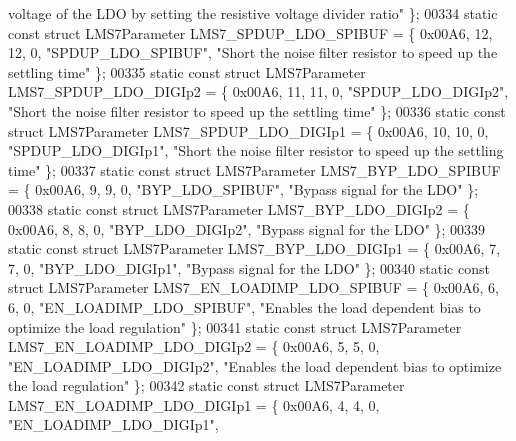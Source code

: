 \begin{DoxyCode}
{       voltage of the LDO by setting the resistive voltage divider ratio"} \};
00334 \textcolor{keyword}{static} \textcolor{keyword}{const} \textcolor{keyword}{struct }LMS7Parameter LMS7_SPDUP_LDO_SPIBUF = \{ 0x00A6, 12, 12, 0, \textcolor{stringliteral}{"SPDUP\_LDO\_SPIBUF"}, \textcolor{stringliteral}{"Short
       the noise filter resistor to speed up the settling time"} \};
00335 \textcolor{keyword}{static} \textcolor{keyword}{const} \textcolor{keyword}{struct }LMS7Parameter LMS7_SPDUP_LDO_DIGIp2 = \{ 0x00A6, 11, 11, 0, \textcolor{stringliteral}{"SPDUP\_LDO\_DIGIp2"}, \textcolor{stringliteral}{"Short
       the noise filter resistor to speed up the settling time"} \};
00336 \textcolor{keyword}{static} \textcolor{keyword}{const} \textcolor{keyword}{struct }LMS7Parameter LMS7_SPDUP_LDO_DIGIp1 = \{ 0x00A6, 10, 10, 0, \textcolor{stringliteral}{"SPDUP\_LDO\_DIGIp1"}, \textcolor{stringliteral}{"Short
       the noise filter resistor to speed up the settling time"} \};
00337 \textcolor{keyword}{static} \textcolor{keyword}{const} \textcolor{keyword}{struct }LMS7Parameter LMS7_BYP_LDO_SPIBUF = \{ 0x00A6, 9, 9, 0, \textcolor{stringliteral}{"BYP\_LDO\_SPIBUF"}, \textcolor{stringliteral}{"Bypass signal
       for the LDO"} \};
00338 \textcolor{keyword}{static} \textcolor{keyword}{const} \textcolor{keyword}{struct }LMS7Parameter LMS7_BYP_LDO_DIGIp2 = \{ 0x00A6, 8, 8, 0, \textcolor{stringliteral}{"BYP\_LDO\_DIGIp2"}, \textcolor{stringliteral}{"Bypass signal
       for the LDO"} \};
00339 \textcolor{keyword}{static} \textcolor{keyword}{const} \textcolor{keyword}{struct }LMS7Parameter LMS7_BYP_LDO_DIGIp1 = \{ 0x00A6, 7, 7, 0, \textcolor{stringliteral}{"BYP\_LDO\_DIGIp1"}, \textcolor{stringliteral}{"Bypass signal
       for the LDO"} \};
00340 \textcolor{keyword}{static} \textcolor{keyword}{const} \textcolor{keyword}{struct }LMS7Parameter LMS7_EN_LOADIMP_LDO_SPIBUF = \{ 0x00A6, 6, 6, 0, \textcolor{stringliteral}{"EN\_LOADIMP\_LDO\_SPIBUF"}, \textcolor{stringliteral}{
      "Enables the load dependent bias to optimize the load regulation"} \};
00341 \textcolor{keyword}{static} \textcolor{keyword}{const} \textcolor{keyword}{struct }LMS7Parameter LMS7_EN_LOADIMP_LDO_DIGIp2 = \{ 0x00A6, 5, 5, 0, \textcolor{stringliteral}{"EN\_LOADIMP\_LDO\_DIGIp2"}, \textcolor{stringliteral}{
      "Enables the load dependent bias to optimize the load regulation"} \};
00342 \textcolor{keyword}{static} \textcolor{keyword}{const} \textcolor{keyword}{struct }LMS7Parameter LMS7_EN_LOADIMP_LDO_DIGIp1 = \{ 0x00A6, 4, 4, 0, \textcolor{stringliteral}{"EN\_LOADIMP\_LDO\_DIGIp1"}, \textcolor{stringliteral}{
}
\end{DoxyCode}
